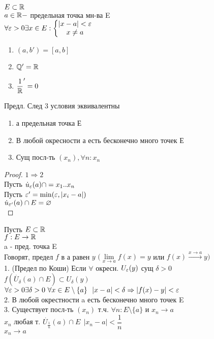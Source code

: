 $ E \subset \mathbb{R} $ \\
$ a \in \mathbb{R} - $ предельная точка мн-ва E \\
$ \forall \varepsilon > 0 \exists x \in E : \left\{ \begin{matrix}
|x-a| < \varepsilon \\
x \neq a 
\end{matrix}\right. $
\begin{enumerate}
	\item $ (a, b') = [a, b] $ 
	\item $ \mathbb{Q}' =  \mathbb{R} $
	\item $\dfrac{1}{\mathbb{R}}' = {0} $ 
\end{enumerate}
Предл. След 3 условия эквивалентны
\begin{enumerate}
	\item а предельная точка Е 
	\item В любой окресности а есть бесконечно много точек Е 
	\item Сущ посл-ть $(x_n), \forall n : x_n$
\end{enumerate}
\begin{proof}
	$ 1 \Rightarrow 2 $ \\
	Пусть $ \dot{u}_{\varepsilon} (a) \cap = {x_1 .. x_n} $ \\
	Пусть $ \varepsilon' = \min (\varepsilon, |x_i - a | ) $\\
	$ \dot{u}_{\varepsilon'} (a) \cap E = \varnothing $ \\
\end{proof}
Пусть $ E \subset \mathbb{R} $ \\
$ f : E \rightarrow \mathbb{R} $ \\
a - пред. точка E \\
Говорят, предел $ f $ в а равен $y$  $ ( \lim\limits_{x \rightarrow a} f(x) = y $ или $ f(x) \xrightarrow{x \rightarrow a} y )$ \\
1. (Предел по Коши) Если $ \forall $ окресн. $ U_{\varepsilon} (y) $ сущ $ \delta > 0 $ \\
$ f (\dot{U_{\delta}}(a) \cap E) \subset U_{\delta} (y) $ \\
$ \forall \eps > 0 \exists \delta > 0 \ \forall x \in E \setminus \{a\} \ \ | x - a | < \delta \Rightarrow | f(x) - y | < \eps $ \\
2. В любой окрестности a есть бесконечно много точек E \\
3. Существует посл-ть $ (x_n) $ т.ч. $ \forall n: E \setminus \{a\}$ и $ x_n \rightarrow a $ \\
$ x_n $ любая т. $ \dot{U_{\frac{1}{n}}} (a) \cap E  \ \ |x_n -a| < \dfrac{1}{n} $ \\
$ x_n \rightarrow a $ 

